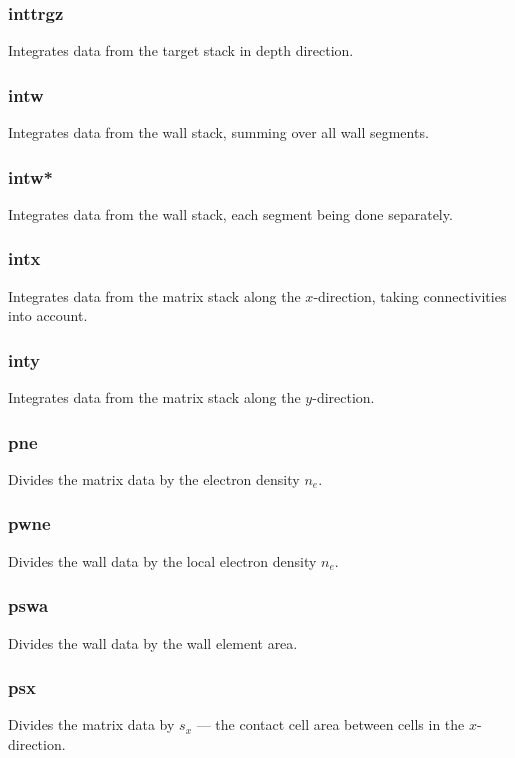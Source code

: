 \documentclass[a4paper,10pt]{report}
\begin{document}
\subsubsection{inttrgz}\label{sec:inttrgz}
Integrates data from the target stack in depth direction.

\subsubsection{intw}\label{sec:intw}
Integrates data from the wall stack, summing over all wall segments.

\subsubsection{intw*}\label{sec:intw*}
Integrates data from the wall stack, each segment being done separately.

\subsubsection{intx}\label{sec:intx}
Integrates data from the matrix stack along the $x$-direction, taking connectivities into account.

\subsubsection{inty}\label{sec:inty}
Integrates data from the matrix stack along the $y$-direction.

\subsubsection{pne}\label{sec:pne}
Divides the matrix data by the electron density $n_e$.

\subsubsection{pwne}\label{sec:pwne}
Divides the wall data by the local electron density $n_e$.

\subsubsection{pswa}\label{sec:pswa}
Divides the wall data by the wall element area.

\subsubsection{psx}\label{sec:psx}
Divides the matrix data by $s_x$ --- the contact cell area between cells in the
$x$-direction.
\end{document}
